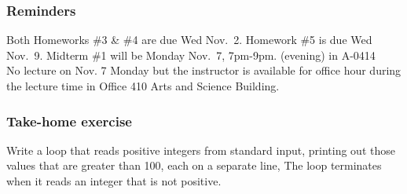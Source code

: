 \documentclass[11pt]{beamer}
\begin{document}
\begin{frame}
  \frametitle{Reminders}
  \Enlarge

 	\begin{itemize}
 		\myitem  Both Homeworks \#3 \& \#4 are due Wed Nov.\ 2.
 		\myitem  Homework \#5 is due Wed Nov.\ 9.
 		\myitem  Midterm \#1 will be Monday Nov.\ 7, 7pm-9pm.  (evening) in A-0414\\ \textcolor{CS101GradBot}{No lecture on Nov. 7 Monday but the instructor is available for office hour during the lecture time in Office 410 Arts and Science Building.}
 	\end{itemize}
\end{frame}

\begin{frame}
  \frametitle{Take-home exercise}
  \Enlarge

  Write a loop that reads positive integers from standard input, printing out those values that are greater than 100, each on a separate line, The loop terminates when it reads an integer that is not positive.
\end{frame}
\end{document}
